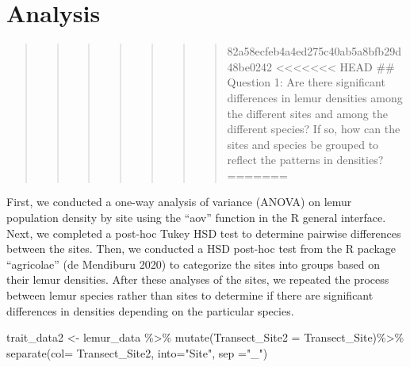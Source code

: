 \documentclass[
  12pt,
]{article}
\newenvironment{Shaded}{\begin{snugshade}}{\end{snugshade}}
\newcommand{\AttributeTok}[1]{\textcolor[rgb]{0.77,0.63,0.00}{#1}}
\newcommand{\FunctionTok}[1]{\textcolor[rgb]{0.00,0.00,0.00}{#1}}
\newcommand{\NormalTok}[1]{#1}
\newcommand{\OtherTok}[1]{\textcolor[rgb]{0.56,0.35,0.01}{#1}}
\newcommand{\SpecialCharTok}[1]{\textcolor[rgb]{0.00,0.00,0.00}{#1}}
\newcommand{\StringTok}[1]{\textcolor[rgb]{0.31,0.60,0.02}{#1}}
\begin{document}
\newpage

\hypertarget{analysis}{%
\section{Analysis}\label{analysis}}

\begin{quote}
\begin{quote}
\begin{quote}
\begin{quote}
\begin{quote}
\begin{quote}
\begin{quote}
82a58ecfeb4a4ed275c40ab5a8bfb29d48be0242
\textless\textless\textless\textless\textless\textless\textless{} HEAD
\#\# Question 1: Are there significant differences in lemur densities
among the different sites and among the different species? If so, how
can the sites and species be grouped to reflect the patterns in
densities? =======
\end{quote}
\end{quote}
\end{quote}
\end{quote}
\end{quote}
\end{quote}
\end{quote}

First, we conducted a one-way analysis of variance (ANOVA) on lemur
population density by site using the ``aov'' function in the R general
interface. Next, we completed a post-hoc Tukey HSD test to determine
pairwise differences between the sites. Then, we conducted a HSD
post-hoc test from the R package ``agricolae'' (de Mendiburu 2020) to
categorize the sites into groups based on their lemur densities. After
these analyses of the sites, we repeated the process between lemur
species rather than sites to determine if there are significant
differences in densities depending on the particular species.

\begin{Shaded}
\begin{Highlighting}[]
\NormalTok{trait\_data2 }\OtherTok{\textless{}{-}}\NormalTok{ lemur\_data }\SpecialCharTok{\%\textgreater{}\%}
  \FunctionTok{mutate}\NormalTok{(}\AttributeTok{Transect\_Site2 =}\NormalTok{ Transect\_Site)}\SpecialCharTok{\%\textgreater{}\%}
  \FunctionTok{separate}\NormalTok{(}\AttributeTok{col=}\NormalTok{ Transect\_Site2, }\AttributeTok{into=}\StringTok{"Site"}\NormalTok{, }\AttributeTok{sep =}\StringTok{"\_"}\NormalTok{)}
\end{Highlighting}
\end{Shaded}
\end{document}
